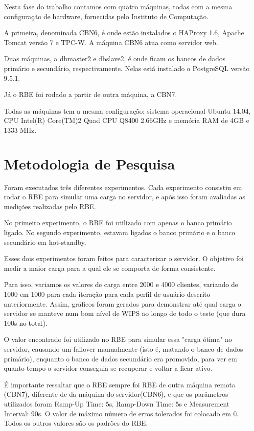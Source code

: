 \documentclass[11pt,twoside]{article}
\begin{document}
     Nesta fase do trabalho contamos com quatro máquinas, todas com a mesma configuração de hardware, fornecidas pelo Instituto de Computação.

     A primeira, denominada CBN6, é onde estão instalados o HAProxy 1.6, Apache Tomcat versão 7 e TPC-W. A máquina CBN6 atua como servidor web.

     Duas máquinas, a dbmaster2 e dbslave2, é onde ficam os bancos de dados primário e secundário, respectivamente. Nelas está instalado o PostgreSQL vers\~ao 9.5.1.

     Já o RBE foi rodado a partir de outra máquina, a CBN7.

     Todas as máquinas tem a mesma configuração: sistema operacional Ubuntu 14.04, CPU Intel(R) Core(TM)2 Quad CPU Q8400 2.66GHz e mem\'oria RAM de 4GB e 1333 MHz.

\section{Metodologia de Pesquisa}
\setlength{\parindent}{4ex}
Foram executados três diferentes experimentos. Cada experimento consistiu em rodar o RBE para simular uma carga no servidor, e após isso foram avaliadas as medições realizadas pelo RBE.

No primeiro experimento, o RBE foi utilizado com apenas o banco primário ligado. No segundo experimento, estavam ligados o banco primário e o banco secundário em hot-standby.

Esses dois experimentos foram feitos para caracterizar o servidor. O objetivo foi medir a maior carga para a qual ele se comporta de forma consistente.

Para isso, variamos os valores de carga entre 2000 e 4000 clientes, variando de 1000 em 1000 para cada iteração para cada perfil de usuário descrito anteriormente. Assim,  gráficos foram gerados para demonstrar até qual carga o servidor se manteve num bom nível de WIPS ao longo de todo o teste (que dura 100s no total).

O valor encontrado foi utilizado no RBE para simular essa "carga ótima" no servidor, causando um failover manualmente (isto é, matando o banco de dados primário), enquanto o banco de dados secundário era promovido, para ver em quanto tempo o servidor conseguia se recuperar e voltar a ficar ativo.

É importante ressaltar que o RBE sempre foi RBE de outra máquina remota (CBN7), diferente de da máquina do servidor(CBN6), e que os parâmetros utilizados foram Ramp-Up Time: 5s, Ramp-Down Time: 5s e Measurement Interval: 90s. O valor de máximo número de erros tolerados foi colocado em 0. Todos os outros valores são os padrões do RBE.
\end{document}
